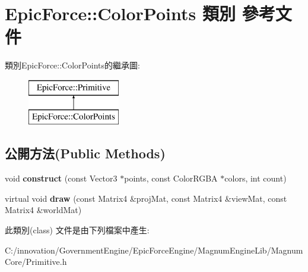 \hypertarget{class_epic_force_1_1_color_points}{}\section{Epic\+Force\+:\+:Color\+Points 類別 參考文件}
\label{class_epic_force_1_1_color_points}
類別\+Epic\+Force\+:\+:Color\+Points的繼承圖\+:\begin{figure}[H]
\begin{center}
\leavevmode
\includegraphics[height=2.000000cm]{class_epic_force_1_1_color_points}
\end{center}
\end{figure}
\subsection*{公開方法(Public Methods)}
\begin{DoxyCompactItemize}
\item 
void {\bfseries construct} (const Vector3 $\ast$points, const Color\+R\+G\+BA $\ast$colors, int count)\hypertarget{class_epic_force_1_1_color_points_aad44ecebe46aed6f22fdc606f6f1dc2b}{}\label{class_epic_force_1_1_color_points_aad44ecebe46aed6f22fdc606f6f1dc2b}

\item 
virtual void {\bfseries draw} (const Matrix4 \&proj\+Mat, const Matrix4 \&view\+Mat, const Matrix4 \&world\+Mat)\hypertarget{class_epic_force_1_1_color_points_ac23bcfdae1075a44318b7805dc5ed28e}{}\label{class_epic_force_1_1_color_points_ac23bcfdae1075a44318b7805dc5ed28e}

\end{DoxyCompactItemize}


此類別(class) 文件是由下列檔案中產生\+:\begin{DoxyCompactItemize}
\item 
C\+:/innovation/\+Government\+Engine/\+Epic\+Force\+Engine/\+Magnum\+Engine\+Lib/\+Magnum\+Core/Primitive.\+h\end{DoxyCompactItemize}
